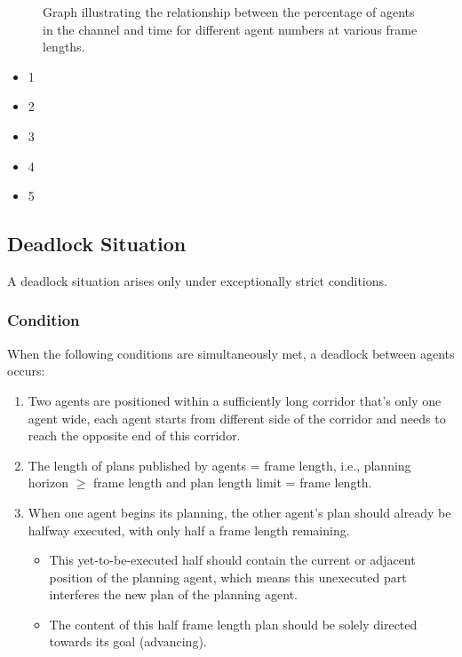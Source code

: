 {\begin{figure}[htb]
    \caption{Graph illustrating the relationship between the percentage of agents in the channel and time for different agent numbers at various frame lengths.}
    \label{fig:grid}
\end{figure}




\begin{itemize}
    \item 1
    \item 2
    \item 3
    \item 4
    \item 5
\end{itemize}

}

\subsection{Deadlock Situation}

A deadlock situation arises only under exceptionally strict conditions.

\subsubsection{Condition}
When the following conditions are simultaneously met, a deadlock between agents occurs:

\begin{enumerate}
    \item Two agents are positioned within a sufficiently long corridor that's only one agent wide, each agent starts from different side of the corridor and needs to reach the opposite end of this corridor.
    \item The length of plans published by agents = frame length, i.e., planning horizon $\geq$ frame length and plan length limit = frame length.
    \item When one agent begins its planning, the other agent's plan should already be halfway executed, 
    with only half a frame length remaining. 
    \begin{itemize}
        \item This yet-to-be-executed half should contain the current or adjacent position of the planning agent, which means this unexecuted part interferes the new plan of the planning agent. 
        \item The content of this half frame length plan should be solely directed towards its goal (advancing).
    \end{itemize}
\end{enumerate}
